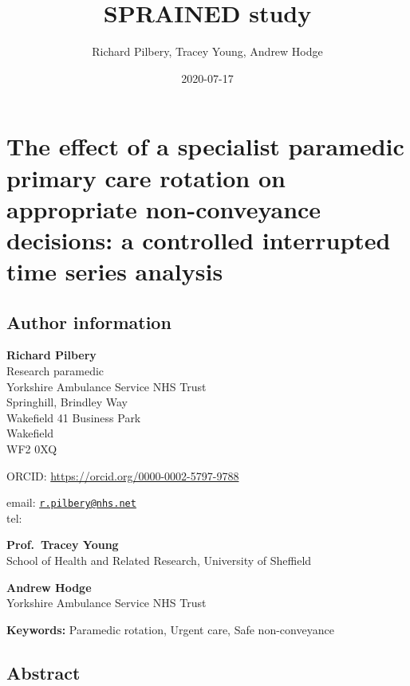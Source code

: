 \documentclass[
  a4paper,
  openany]{article}
\title{SPRAINED study}
\author{Richard Pilbery, Tracey Young, Andrew Hodge}
\date{2020-07-17}
\begin{document}
\maketitle

{
\setcounter{tocdepth}{2}
\tableofcontents
}
\hypertarget{the-effect-of-a-specialist-paramedic-primary-care-rotation-on-appropriate-non-conveyance-decisions-a-controlled-interrupted-time-series-analysis}{%
\section*{The effect of a specialist paramedic primary care rotation on appropriate non-conveyance decisions: a controlled interrupted time series analysis}\label{the-effect-of-a-specialist-paramedic-primary-care-rotation-on-appropriate-non-conveyance-decisions-a-controlled-interrupted-time-series-analysis}}

\hypertarget{author-information}{%
\subsection*{Author information}\label{author-information}}

\textbf{Richard Pilbery}\\
Research paramedic\\
Yorkshire Ambulance Service NHS Trust\\
Springhill, Brindley Way\\
Wakefield 41 Business Park\\
Wakefield\\
WF2 0XQ

ORCID: \url{https://orcid.org/0000-0002-5797-9788}

email: \href{mailto:r.pilbery@nhs.net}{\nolinkurl{r.pilbery@nhs.net}}\\
tel:

\textbf{Prof.~Tracey Young}\\
School of Health and Related Research, University of Sheffield

\textbf{Andrew Hodge}\\
Yorkshire Ambulance Service NHS Trust

\textbf{Keywords:} Paramedic rotation, Urgent care, Safe non-conveyance

\hypertarget{abstract}{%
\subsection*{Abstract}\label{abstract}}
\end{document}
